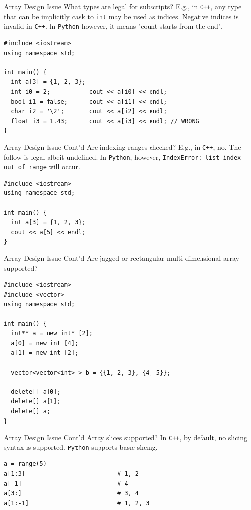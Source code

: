 \documentclass[presentation]{beamer}
\begin{document}
\begin{frame}[fragile,label={sec:orgheadline18}]{Array Design Issue}
 What types are legal for subscripts?  E.g., in \texttt{C++}, any type that
can be implicitly cask to \texttt{int} may be used as indices.  Negative
indices is invalid in \texttt{C++}.  In \texttt{Python} however, it means "count
starts from the end".

\begin{verbatim}
#include <iostream>
using namespace std;

int main() {
  int a[3] = {1, 2, 3};
  int i0 = 2;           cout << a[i0] << endl;
  bool i1 = false;      cout << a[i1] << endl;
  char i2 = '\2';       cout << a[i2] << endl;
  float i3 = 1.43;      cout << a[i3] << endl; // WRONG
}
\end{verbatim}
\end{frame}

\begin{frame}[fragile,label={sec:orgheadline19}]{Array Design Issue Cont'd}
 Are indexing ranges checked?  E.g., in \texttt{C++}, no.  The follow is
legal albeit undefined.  In \texttt{Python}, however, \texttt{IndexError: list
   index out of range} will occur.

\begin{verbatim}
#include <iostream>
using namespace std;

int main() {
  int a[3] = {1, 2, 3};
  cout << a[5] << endl;
}
\end{verbatim}
\end{frame}

\begin{frame}[fragile,label={sec:orgheadline20}]{Array Design Issue Cont'd}
 Are jagged or rectangular multi-dimensional array supported?

\begin{verbatim}
#include <iostream>
#include <vector>
using namespace std;

int main() {
  int** a = new int* [2];
  a[0] = new int [4];
  a[1] = new int [2];

  vector<vector<int> > b = {{1, 2, 3}, {4, 5}};

  delete[] a[0];
  delete[] a[1];
  delete[] a;
}
\end{verbatim}
\end{frame}

\begin{frame}[fragile,label={sec:orgheadline21}]{Array Design Issue Cont'd}
 Array slices supported?  In \texttt{C++}, by default, no slicing syntax is
supported.  \texttt{Python} supports basic slicing.

\begin{verbatim}
a = range(5)
a[1:3]                          # 1, 2
a[-1]                           # 4
a[3:]                           # 3, 4
a[1:-1]                         # 1, 2, 3
\end{verbatim}
\end{frame}
\end{document}
